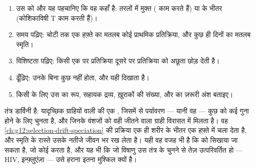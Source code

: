 \begin{method}[किसी प्रतिरक्षा प्रतिक्रिया को पढ़ना]\label{met:g12:adaptive-immunity:read}
\begin{enumerate}
  \item उस  को और यह पहचानिए कि वह कहाँ है: तरलों में मुक्त
        ( काम करते हैं) या  के भीतर (कोशिकाविषी T
         काम करती हैं)।
  \item समय पढ़िए: चोटी तक एक हफ़्ते का मतलब कोई प्राथमिक प्रतिक्रिया, और
        कुछ ही दिनों का मतलब स्मृति।
  \item विशिष्टता पढ़िए: किसी एक  पर प्रतिक्रिया दूसरे पर
        प्रतिक्रिया को अछूता छोड़ देती है।
  \item {} ढूँढ़िए: उनके बिना कुछ नहीं होता, और  यही
        दिखाता है।
  \item किसी  के लिए उस  का रूप, सहायक द्रव्य, ख़ुराकों की
        संख्या, और  का ज़रूरी अंश बताइए।
\end{enumerate}
\end{method}

\begin{remark}[वरण, एक बार फिर]\label{rem:g12:adaptive-immunity:selection}
 तंत्र डार्विनी है: यादृच्छिक ग्राहियों वाली  की
एक , जिसमें से पर्यावरण --- यानी वह  --- कुछ को कई गुना होने के
लिए चुनता है, और जिनके वंशजों को वही जीतने वाला ग्राही विरासत में मिलता है।
वह \cref{ch:g12:selection-drift-speciation} की प्रक्रिया एक ही शरीर के भीतर
एक हफ़्ते में चला देता है, और स्मृति के रास्ते उसके नतीजे जीवन भर रख लेता
है। यही वह वजह भी है कि  को सिखाया जा सकता है, जो कोई 
करता है, और यह भी कि जो विषाणु उस तंत्र के चुनने से तेज़ उत्परिवर्तित हो
--- HIV, इन्फ़्लुएंज़ा --- उसे हराना इतना मुश्किल क्यों है।
\end{remark}


